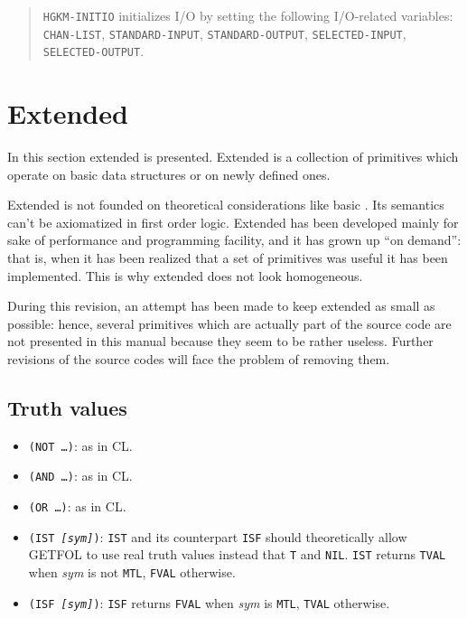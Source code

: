 \begin{quote}
	{\tt HGKM-INITIO} initializes I/O by setting the following I/O-related
	variables:  {\tt CHAN-LIST}, {\tt STANDARD-INPUT}, {\tt STANDARD-OUTPUT},
	{\tt SELECTED-INPUT}, {\tt SELECTED-OUTPUT}.
\end{quote}


\pagebreak
\section{Extended {\HG}}

In this section extended {\HG} is presented.
Extended {\HG} is a collection of primitives which operate on basic {\HG} data
structures or on newly defined ones.

Extended {\HG} is not founded on theoretical considerations like basic {\HG}.
Its semantics can't be axiomatized in first order logic.
Extended {\HG} has been developed mainly for sake of performance and programming
facility, and it has grown up ``on demand'': that is, when it has been realized
that a set of primitives was useful it has been implemented. This is why
extended {\HG} does not look homogeneous.

During this revision, an attempt has been made to keep extended {\HG} as small
as possible: hence, several primitives which are actually part of the source
code are not presented in this manual because they seem to be rather useless.
Further revisions of the source codes will face the problem of removing them.


\subsection{Truth values}

\begin{itemize}
	\item {\tt (NOT \ldots)}: as in CL.
	\item {\tt (AND \ldots)}: as in CL.
	\item {\tt (OR \ldots)}: as in CL.
	\item {\tt (IST {\it [sym]})}:
	  {\tt IST} and its counterpart {\tt ISF} should theoretically allow GETFOL
	  to use real truth values instead that {\tt T} and {\tt NIL}. {\tt IST}
	  returns {\tt TVAL} when {\it sym} is not {\tt MTL}, {\tt FVAL} otherwise.
	\item {\tt (ISF {\it [sym]})}:
	  {\tt ISF} returns {\tt FVAL} when {\it sym} is {\tt MTL}, {\tt TVAL}
	  otherwise.
\end{itemize}


